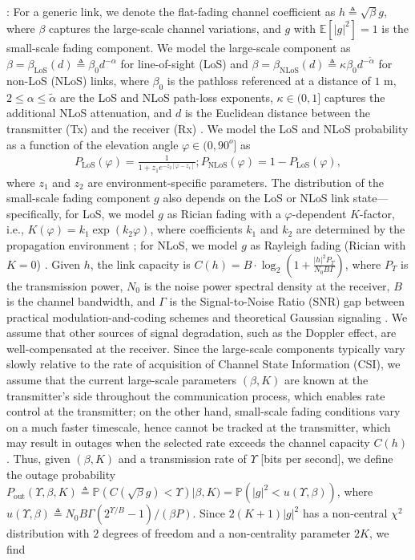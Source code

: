\documentclass[10pt,twocolumn]{IEEEtran}
\begin{document}
: For a generic link, we denote the flat-fading channel coefficient as $h{\triangleq}\sqrt{\beta}g$, where $\beta$ captures the large-scale channel variations, and $g$ with $\mathbb{E}\left[|g|^2\right]{=}1$ is the small-scale fading component. We model the large-scale component as $\beta{=}\beta_{\mathrm{LoS}}(d){\triangleq}\beta_{0}d^{-\alpha}$ for line-of-sight (LoS) and $\beta{=}\beta_{\mathrm{NLoS}}(d){\triangleq}\kappa\beta_{0}d^{-\tilde{\alpha}}$ for non-LoS (NLoS) links, where $\beta_{0}$ is the pathloss referenced at a distance of $1$ m, $2{\leq}\alpha{\leq}\tilde{\alpha}$ are the LoS and NLoS path-loss exponents, $\kappa{\in}(0,1]$ captures the additional NLoS attenuation, and $d$ is the Euclidean distance between the transmitter (Tx) and the receiver (Rx) \cite{SCA}. We model the LoS and NLoS probability as a function of the elevation angle $\varphi{\in}(0,90^{o}]$ as
\begin{align}\label{eq:PLoS}
	P_{\mathrm{LoS}}(\varphi){=}\frac{1}{1{+}z_{1}e^{{-}z_{2}[\varphi{-}z_{1}]}};P_{\mathrm{NLoS}}(\varphi){=}1{-}P_{\mathrm{LoS}}(\varphi),
\end{align}
where $z_{1}$ and $z_{2}$ are environment-specific parameters. The distribution of the small-scale fading component $g$ also depends on the LoS or NLoS link state---specifically, for LoS, we model $g$ as Rician fading with a $\varphi$-dependent $K$-factor, i.e., $K(\varphi){=}k_{1}\exp\left(k_{2}\varphi\right)$, where coefficients $k_{1}$ and $k_{2}$ are determined by the propagation environment \cite{Rician}; for NLoS, we model $g$ as Rayleigh fading (Rician with $K{=}0$) \cite{Rician}. Given $h$, the link capacity is $C(h){=}B{\cdot}\log_{2}\left(1{+}\frac{|h|^{2}P_{T}}{N_{0}B\Gamma} \right)$, where $P_{T}$ is the transmission power, $N_{0}$ is the noise power spectral density at the receiver, $B$ is the channel bandwidth, and $\Gamma$ is the Signal-to-Noise Ratio (SNR) gap between practical modulation-and-coding schemes and theoretical Gaussian signaling \cite{Rician}. We assume that other sources of signal degradation, such as the Doppler effect, are well-compensated at the receiver. Since the large-scale components typically vary slowly relative to the rate of acquisition of Channel State Information (CSI), we assume that the current large-scale parameters $(\beta,K)$ are known at the transmitter's side throughout the communication process, which enables rate control at the transmitter; on the other hand, small-scale fading conditions vary on a much faster timescale, hence cannot be tracked at the transmitter, which may result in outages when the selected rate exceeds the channel capacity $C(h)$. Thus, given $(\beta,K)$ and a transmission rate of $\Upsilon$ [bits per second], we define the outage probability $P_{\mathrm{out}}(\Upsilon,\beta,K) \triangleq \mathbb{P}(C(\sqrt{\beta}g){<}\Upsilon)|\beta,K) = \mathbb{P}\left(|g|^{2}{<}u(\Upsilon,\beta)\right)$, where $u(\Upsilon,\beta){\triangleq}N_{0}B\Gamma(2^{\Upsilon/B}{-}1)/(\beta P)$. Since $2(K{+}1)|g|^{2}$ has a non-central $\chi^2$ distribution with $2$ degrees of freedom and a non-centrality parameter $2K$, we find
\end{document}
